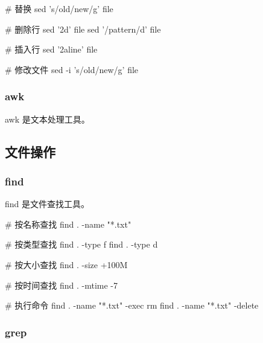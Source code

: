 
\begin{lstcode}[numbers=none]
  # 替换
  sed 's/old/new/g' file

  # 删除行
  sed '2d' file
  sed '/pattern/d' file

  # 插入行
  sed '2a\new line' file

  # 修改文件
  sed -i 's/old/new/g' file
\end{lstcode}

\subsubsection{awk}

awk 是文本处理工具。



\subsection{文件操作}

\subsubsection{find}

find 是文件查找工具。


\begin{lstcode}[numbers=none]
  # 按名称查找
  find . -name "*.txt"

  # 按类型查找
  find . -type f
  find . -type d

  # 按大小查找
  find . -size +100M

  # 按时间查找
  find . -mtime -7

  # 执行命令
  find . -name "*.txt" -exec rm {} \;
  find . -name "*.txt" -delete
\end{lstcode}

\subsubsection{grep}

